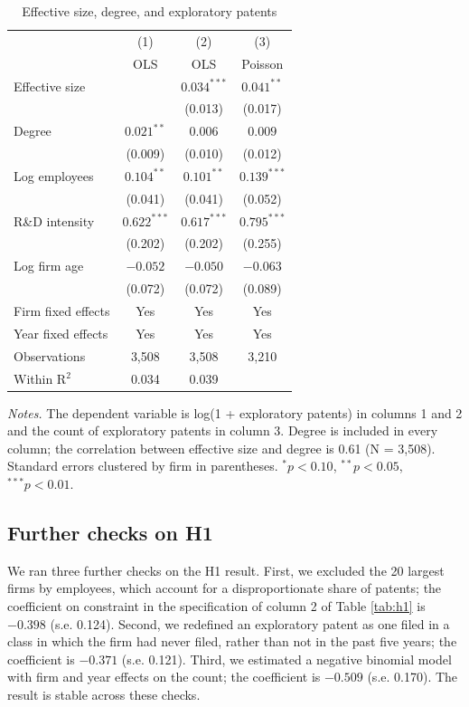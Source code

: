 \documentclass[12pt]{article}
\begin{document}
\begin{table}[!htbp]
\centering
\begin{threeparttable}
\caption{Effective size, degree, and exploratory patents}
\label{tab:effsize}
\small
\begin{tabular}{lccc}
\toprule
 & (1) & (2) & (3) \\
 & OLS & OLS & Poisson \\
\midrule
Effective size & & $0.034^{***}$ & $0.041^{**}$ \\
 & & (0.013) & (0.017) \\
Degree & $0.021^{**}$ & $0.006$ & $0.009$ \\
 & (0.009) & (0.010) & (0.012) \\
Log employees & $0.104^{**}$ & $0.101^{**}$ & $0.139^{***}$ \\
 & (0.041) & (0.041) & (0.052) \\
R\&D intensity & $0.622^{***}$ & $0.617^{***}$ & $0.795^{***}$ \\
 & (0.202) & (0.202) & (0.255) \\
Log firm age & $-0.052$ & $-0.050$ & $-0.063$ \\
 & (0.072) & (0.072) & (0.089) \\
\midrule
Firm fixed effects & Yes & Yes & Yes \\
Year fixed effects & Yes & Yes & Yes \\
Observations & 3,508 & 3,508 & 3,210 \\
Within R$^2$ & 0.034 & 0.039 & \\
\bottomrule
\end{tabular}
\begin{tablenotes}
\footnotesize
\item \textit{Notes.} The dependent variable is log(1 + exploratory patents) in columns 1 and 2 and the count of exploratory patents in column 3. Degree is included in every column; the correlation between effective size and degree is 0.61 (N = 3,508). Standard errors clustered by firm in parentheses. $^{*}p<0.10$, $^{**}p<0.05$, $^{***}p<0.01$.
\end{tablenotes}
\end{threeparttable}
\end{table}

\subsection{Further checks on H1}

We ran three further checks on the H1 result. First, we excluded the 20 largest firms by employees, which account for a disproportionate share of patents; the coefficient on constraint in the specification of column 2 of Table \ref{tab:h1} is $-0.398$ (s.e. 0.124). Second, we redefined an exploratory patent as one filed in a class in which the firm had never filed, rather than not in the past five years; the coefficient is $-0.371$ (s.e. 0.121). Third, we estimated a negative binomial model with firm and year effects on the count; the coefficient is $-0.509$ (s.e. 0.170). The result is stable across these checks.
\end{document}
